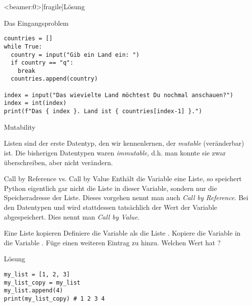 \begin{frame}<beamer:0>[fragile]{Lösung}
\begin{solutionblock}{Das Eingangsproblem}
\begin{verbatim}
countries = []
while True:
  country = input("Gib ein Land ein: ")
  if country == "q":
    break
  countries.append(country)

index = input("Das wievielte Land möchtest Du nochmal anschauen?")
index = int(index)
print(f"Das { index }. Land ist { countries[index-1] }.")
\end{verbatim}
\end{solutionblock}
\end{frame}


\begin{frame}
\begin{block}{Mutability}

\vspace{2pt}
Listen sind der erste Datentyp, den wir kennenlernen, der \emph{mutable} (veränderbar) ist. Die bisherigen Datentypen waren \emph{immutable}, d.h. man konnte sie zwar überschreiben, aber nicht verändern. 
\end{block}

\pause 
\vspace{12pt}

\begin{block}{Call by Reference vs. Call by Value}
\vspace{2pt}
Enthält die Variable  eine Liste, so speichert Python eigentlich gar nicht die Liste in dieser Variable, sondern nur die Speicheradresse der Liste. 
Dieses vorgehen nennt man auch \emph{Call by Reference}. Bei den Datentypen  und  wird stattdessen tatsächlich der Wert der Variable abgespeichert. Dies nennt man \emph{Call by Value}.

\end{block}
\end{frame}

\begin{fragile}[Übung]
\begin{block}{Eine Liste kopieren}
\vspace{2pt}
Definiere die Variable  als die Liste \py{[1,2,3]}. Kopiere die Variable  in die Variable . Füge einen weiteren Eintrag zu  hinzu. Welchen Wert hat ? 
\end{block}
\vspace{12pt}
\begin{solutionblock}{Lösung}
\begin{verbatim}
my_list = [1, 2, 3]
my_list_copy = my_list
my_list.append(4)
print(my_list_copy) # 1 2 3 4 
\end{verbatim}
\end{solutionblock}
\end{fragile}



